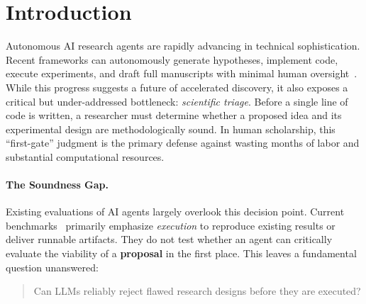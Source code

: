 \section{Introduction}

Autonomous AI research agents are rapidly advancing in technical sophistication. Recent frameworks can autonomously generate hypotheses, implement code, execute experiments, and draft full manuscripts with minimal human oversight~\citep{lu2024aiscientist, yamada2025aiscientistv2, schmidgall2025agentlab, karpathy2026autoresearch}. While this progress suggests a future of accelerated discovery, it also exposes a critical but under-addressed bottleneck: \textit{scientific triage}. Before a single line of code is written, a researcher must determine whether a proposed idea and its experimental design are methodologically sound. In human scholarship, this ``first-gate'' judgment is the primary defense against wasting months of labor and substantial computational resources.

\paragraph{The Soundness Gap.} Existing evaluations of AI agents largely overlook this decision point. Current benchmarks~\citep{chan2024mle, starace2025paperbench, wu2025innovatorbench, lupidi2026airs} primarily emphasize \textit{execution} to reproduce existing results or deliver runnable artifacts. They do not test whether an agent can critically evaluate the viability of a \textbf{proposal} in the first place. This leaves a fundamental question unanswered: 

\begin{quote}
Can LLMs reliably reject flawed research designs before they are executed? 
\end{quote}


